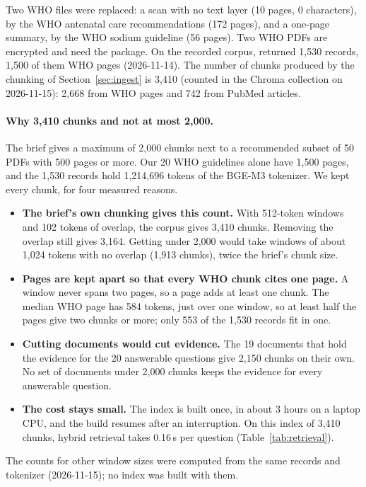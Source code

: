 Two WHO files were replaced: a scan with no text layer (10 pages, 0 characters), by the WHO antenatal care recommendations (172 pages), and a one-page summary, by the WHO sodium guideline (56 pages). Two WHO PDFs are encrypted and need the  package. On the recorded corpus,  returned 1,530 records, 1,500 of them WHO pages (2026-11-14). The number of chunks produced by the chunking of Section~\ref{sec:ingest} is 3,410 (counted in the Chroma collection on 2026-11-15): 2,668 from WHO pages and 742 from PubMed articles.

\paragraph{Why 3,410 chunks and not at most 2,000.} The brief gives a maximum of 2,000 chunks next to a recommended subset of 50 PDFs with 500 pages or more. Our 20 WHO guidelines alone have 1,500 pages, and the 1,530 records hold 1,214,696 tokens of the BGE-M3 tokenizer. We kept every chunk, for four measured reasons.
\begin{itemize}
  \item \textbf{The brief's own chunking gives this count.} With 512-token windows and 102 tokens of overlap, the corpus gives 3,410 chunks. Removing the overlap still gives 3,164. Getting under 2,000 would take windows of about 1,024 tokens with no overlap (1,913 chunks), twice the brief's chunk size.
  \item \textbf{Pages are kept apart so that every WHO chunk cites one page.} A window never spans two pages, so a page adds at least one chunk. The median WHO page has 584 tokens, just over one window, so at least half the pages give two chunks or more; only 553 of the 1,530 records fit in one.
  \item \textbf{Cutting documents would cut evidence.} The 19 documents that hold the evidence for the 20 answerable questions give 2,150 chunks on their own. No set of documents under 2,000 chunks keeps the evidence for every answerable question.
  \item \textbf{The cost stays small.} The index is built once, in about 3 hours on a laptop CPU, and the build resumes after an interruption. On this index of 3,410 chunks, hybrid retrieval takes 0.16\,s per question (Table~\ref{tab:retrieval}).
\end{itemize}
The counts for other window sizes were computed from the same records and tokenizer (2026-11-15); no index was built with them.

